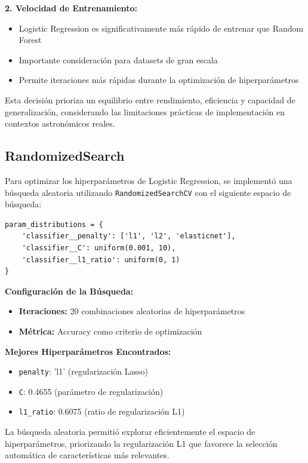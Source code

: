 \documentclass{article}
\begin{document}
\textbf{2. Velocidad de Entrenamiento:}
\begin{itemize}
    \item Logistic Regression es significativamente más rápido de entrenar que Random Forest
    \item Importante consideración para datasets de gran escala
    \item Permite iteraciones más rápidas durante la optimización de hiperparámetros
\end{itemize}

Esta decisión prioriza un equilibrio entre rendimiento, eficiencia y capacidad de generalización, considerando las limitaciones prácticas de implementación en contextos astronómicos reales.

\subsection{RandomizedSearch}

Para optimizar los hiperparámetros de Logistic Regression, se implementó una búsqueda aleatoria utilizando \texttt{RandomizedSearchCV} con el siguiente espacio de búsqueda:

\begin{verbatim}
param_distributions = {
    'classifier__penalty': ['l1', 'l2', 'elasticnet'],
    'classifier__C': uniform(0.001, 10),
    'classifier__l1_ratio': uniform(0, 1)
}
\end{verbatim}

\textbf{Configuración de la Búsqueda:}
\begin{itemize}
    \item \textbf{Iteraciones:} 20 combinaciones aleatorias de hiperparámetros
    \item \textbf{Métrica:} Accuracy como criterio de optimización
\end{itemize}

\textbf{Mejores Hiperparámetros Encontrados:}
\begin{itemize}
    \item \texttt{penalty}: 'l1' (regularización Lasso)
    \item \texttt{C}: 0.4655 (parámetro de regularización)
    \item \texttt{l1\_ratio}: 0.6075 (ratio de regularización L1)
\end{itemize}

La búsqueda aleatoria permitió explorar eficientemente el espacio de hiperparámetros, priorizando la regularización L1 que favorece la selección automática de características más relevantes.
\end{document}

